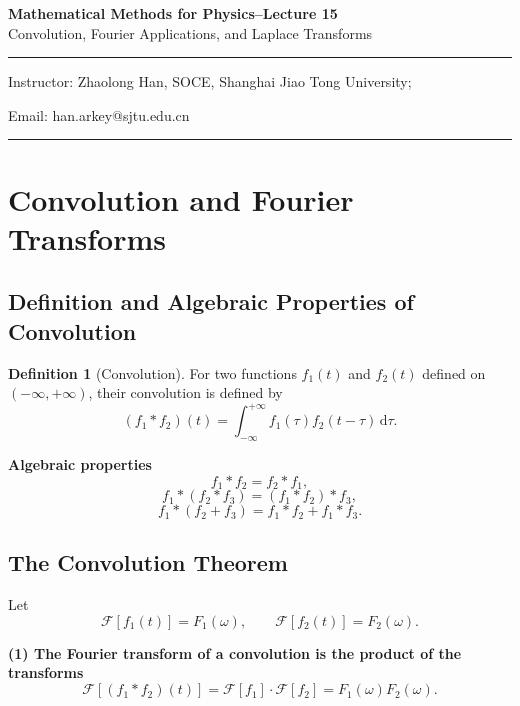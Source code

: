 \documentclass[11pt,a4paper]{article}
\theoremstyle{definition}
\newtheorem{definition}{Definition}
\theoremstyle{plain}
\begin{document}
\begin{center}
    {\LARGE \textbf{Mathematical Methods for Physics--Lecture 15}} \\[0.6em]
    {\large Convolution, Fourier Applications, and Laplace Transforms}
\end{center}

\vspace{-0.5em}
\noindent\rule{\textwidth}{0.5pt}
\vspace{0.3em}

\begin{center}
    Instructor: Zhaolong Han, SOCE, Shanghai Jiao Tong University;
\end{center}

\vspace{-0.6em}
\noindent Email: han.arkey@sjtu.edu.cn

\vspace{0.4em}
\noindent\rule{\textwidth}{0.5pt}

\vspace{0.8em}

\section{Convolution and Fourier Transforms}

\subsection{Definition and Algebraic Properties of Convolution}

\begin{definition}[Convolution]

For two functions \(f_1(t)\) and \(f_2(t)\) defined on
\((-\infty,+\infty)\), their convolution is defined by
\[
(f_1*f_2)(t)
=\int_{-\infty}^{+\infty}
f_1(\tau)f_2(t-\tau)\,\mathrm d\tau.
\]

\end{definition}

\textbf{Algebraic properties}
\[
f_1*f_2=f_2*f_1,
\]
\[
f_1*(f_2*f_3)=(f_1*f_2)*f_3,
\]
\[
f_1*(f_2+f_3)=f_1*f_2+f_1*f_3.
\]

\subsection{The Convolution Theorem}

Let
\[
\mathcal F[f_1(t)]=F_1(\omega),
\qquad
\mathcal F[f_2(t)]=F_2(\omega).
\]

\textbf{(1) The Fourier transform of a convolution is the product of the
transforms}
\[
\mathcal F[(f_1*f_2)(t)]
=\mathcal F[f_1]\cdot\mathcal F[f_2]
=F_1(\omega)F_2(\omega).
\]
\end{document}

